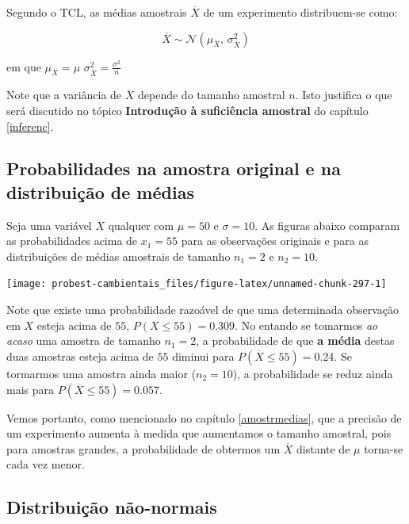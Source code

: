 \documentclass[
]{book}
\begin{document}
Segundo o TCL, as médias amostrais \(\overline{X}\) de um experimento distribuem-se como:

\[\overline{X} \sim \mathcal{N}(\mu_{\overline{X}},\,\sigma^{2}_{\overline{X}})\]

em que \(\mu_{\overline{X}} = \mu\) \(\sigma^{2}_{\overline{X}} = \frac{\sigma^2}{n}\)

Note que a variância de \(\overline{X}\) depende do tamanho amostral \(n\). Isto justifica o que será discutido no tópico \textbf{Introdução à suficiência amostral} do capítulo \ref{inferenc}.

\hypertarget{probabilidades-na-amostra-original-e-na-distribuiuxe7uxe3o-de-muxe9dias}{%
\subsection{Probabilidades na amostra original e na distribuição de médias}\label{probabilidades-na-amostra-original-e-na-distribuiuxe7uxe3o-de-muxe9dias}}

Seja uma variável \(X\) qualquer com \(\mu = 50\) e \(\sigma = 10\). As figuras abaixo comparam as probabilidades acima de \(x_1 = 55\) para as observações originais e para as distribuições de médias amostrais de tamanho \(n_1 = 2\) e \(n_2 = 10\).

\begin{center}\texttt{[image: probest-cambientais\_files/figure-latex/unnamed-chunk-297-1]} \end{center}

Note que existe uma probabilidade razoável de que uma determinada observação em \(X\) esteja acima de \(55\), \(P(X \leq 55) = 0.309\). No entando se tomarmos \emph{ao acaso} uma amostra de tamanho \(n_1 = 2\), a probabilidade de que \textbf{a média} destas duas amostras esteja acima de \(55\) diminui para \(P(\overline{X} \leq 55) = 0.24\). Se tormarmos uma amostra ainda maior (\(n_2 = 10\)), a probabilidade se reduz ainda mais para \(P(\overline{X} \leq 55) = 0.057\).

Vemos portanto, como mencionado no capítulo \ref{amostrmedias}, que a precisão de um experimento aumenta à medida que aumentamos o tamanho amostral, pois para amostras grandes, a probabilidade de obtermos um \(\overline{X}\) distante de \(\mu\) torna-se cada vez menor.

\hypertarget{distribuiuxe7uxe3o-nuxe3o-normais}{%
\subsection{Distribuição não-normais}\label{distribuiuxe7uxe3o-nuxe3o-normais}}
\end{document}
